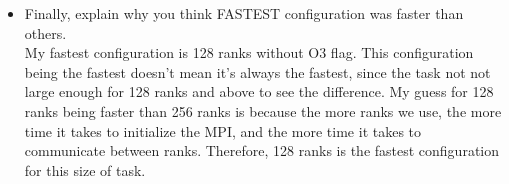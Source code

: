 \documentclass{article}
\begin{document}
\begin{itemize}
  \item Finally, explain why you think FASTEST configuration was faster than others.\\
  My fastest configuration is 128 ranks without O3 flag. This configuration being the fastest doesn't mean it's always the fastest, since the task not not large enough for 128 ranks and above to see the difference. My guess for 128 ranks being faster than 256 ranks is because the more ranks we use, the more time it takes to initialize the MPI, and the more time it takes to communicate between ranks. Therefore, 128 ranks is the fastest configuration for this size of task.

\end{itemize}
\end{document}
